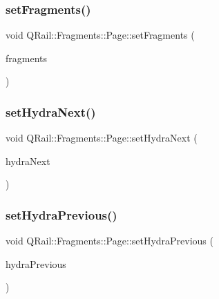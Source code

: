 \mbox{\label{classQRail_1_1Fragments_1_1Page_a0d779fadca796cc40cba14a27f0d141e}} 
\subsubsection{\texorpdfstring{setFragments()}{setFragments()}}
{\footnotesize\ttfamily void Q\+Rail\+::\+Fragments\+::\+Page\+::set\+Fragments (\begin{DoxyParamCaption}\item[{const Q\+List$<$ \mbox{\hyperlink{classQRail_1_1Fragments_1_1Fragment}{Q\+Rail\+::\+Fragments\+::\+Fragment}} $\ast$ $>$ \&}]{fragments }\end{DoxyParamCaption})}

\mbox{\label{classQRail_1_1Fragments_1_1Page_a91fb6b3858cf55f4f3839837f55784a0}} 
\subsubsection{\texorpdfstring{setHydraNext()}{setHydraNext()}}
{\footnotesize\ttfamily void Q\+Rail\+::\+Fragments\+::\+Page\+::set\+Hydra\+Next (\begin{DoxyParamCaption}\item[{const Q\+Url \&}]{hydra\+Next }\end{DoxyParamCaption})}

\mbox{\label{classQRail_1_1Fragments_1_1Page_ad5744b16116e8fc0d7781e45b54a49e9}} 
\subsubsection{\texorpdfstring{setHydraPrevious()}{setHydraPrevious()}}
{\footnotesize\ttfamily void Q\+Rail\+::\+Fragments\+::\+Page\+::set\+Hydra\+Previous (\begin{DoxyParamCaption}\item[{const Q\+Url \&}]{hydra\+Previous }\end{DoxyParamCaption})}

